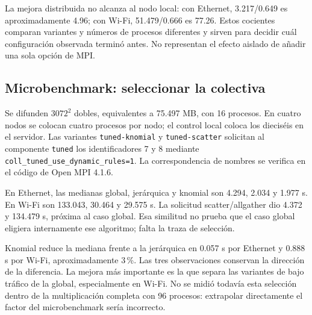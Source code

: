 \begin{table}[H]\caption{Magnitud de los efectos. A/B nombra el caso de referencia y su alternativa; las reducciones se calculan a partir de medianas. Mismo $N=3072$ y cuatro nodos. Un porcentaje negativo indica un aumento de TX.}\label{tab:efectos}

\end{table}

La mejora distribuida no alcanza al nodo local: con Ethernet, 3.217/0.649 es aproximadamente 4.96; con Wi-Fi, 51.479/0.666 es 77.26. Estos cocientes comparan variantes y números de procesos diferentes y sirven para decidir cuál configuración observada terminó antes. No representan el efecto aislado de añadir una sola opción de MPI.

\subsection{Microbenchmark: seleccionar la colectiva}

Se difunden $3072^2$ dobles, equivalentes a 75.497 MB, con 16 procesos. En cuatro nodos se colocan cuatro procesos por nodo; el control local coloca los dieciséis en el servidor. Las variantes \texttt{tuned-knomial} y \texttt{tuned-scatter} solicitan al componente \texttt{tuned} los identificadores 7 y 8 mediante \texttt{coll\_tuned\_use\_dynamic\_rules=1}. La correspondencia de nombres se verifica en el código de Open MPI 4.1.6\cite{ompi-tuned}.


En Ethernet, las medianas global, jerárquica y knomial son 4.294, 2.034 y 1.977 s. En Wi-Fi son 133.043, 30.464 y 29.575 s. La solicitud scatter/allgather dio 4.372 y 134.479 s, próxima al caso global. Esa similitud no prueba que el caso global eligiera internamente ese algoritmo; falta la traza de selección.

Knomial reduce la mediana frente a la jerárquica en 0.057 s por Ethernet y 0.888 s por Wi-Fi, aproximadamente 3\,\%. Las tres observaciones conservan la dirección de la diferencia. La mejora más importante es la que separa las variantes de bajo tráfico de la global, especialmente en Wi-Fi. No se midió todavía esta selección dentro de la multiplicación completa con 96 procesos: extrapolar directamente el factor del microbenchmark sería incorrecto.

